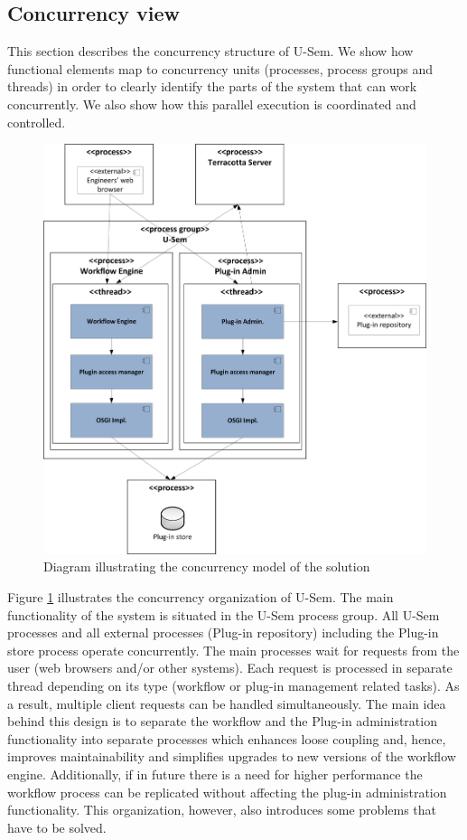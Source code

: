 \subsection{Concurrency view}
\label{sec:pluginConcur}

This section describes the concurrency structure of U-Sem. We show how functional elements map to concurrency units (processes, process groups and threads) in order to clearly identify the parts of the system that can work concurrently. We also show how this parallel execution is coordinated and controlled.

\begin{figure}[h!]
  \centering
  	\includegraphics[scale=0.70]{plug-in/layers/concur.png}
  \caption{Diagram illustrating the concurrency model of the solution}
  \label{fig_conc}
\end{figure}

Figure \ref{fig_conc} illustrates the concurrency organization of U-Sem. The main functionality of the system is situated in the U-Sem process group. All U-Sem processes and all external processes (Plug-in repository) including the Plug-in store process operate concurrently. The main processes wait for requests from the user (web browsers and/or other systems). Each request is processed in separate thread depending on its type (workflow or plug-in management related tasks). As a result, multiple client requests can be handled simultaneously. The main idea behind this design is to separate the workflow and the Plug-in administration functionality into separate processes which enhances loose coupling and, hence, improves maintainability and simplifies upgrades to new versions of the workflow engine. Additionally, if in future there is a need for higher performance the workflow process can be replicated without affecting the plug-in administration functionality. This organization, however, also introduces some problems that have to be solved.

